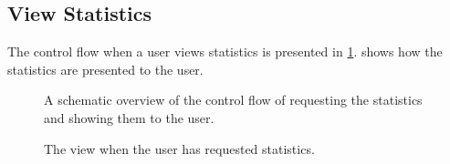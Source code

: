 	\subsection{View Statistics}
		The control flow when a user views statistics is presented in \cref{fig:1:controlflowStat}.  shows how the statistics are presented to the user.


		\begin{figure}
			\caption{A schematic overview of the control flow of requesting the statistics and showing them to the user.}
			\label{fig:1:controlflowStat}
		\end{figure}

		\begin{figure}
			\caption{The view when the user has requested statistics.}
			\label{fig:1:viewStat}
		\end{figure}